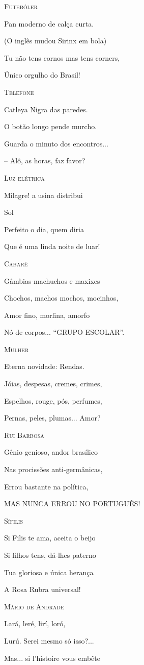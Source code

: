 \textsc{Futebóler}

Pan moderno de calça curta.

(O inglês mudou Sirinx em bola)

Tu não tens cornos mas tens corners,

Único orgulho do Brasil!

\textsc{Telefone}

Catleya Nigra das paredes.

O botão longo pende murcho.

Guarda o minuto dos encontros...

-- Alô, as horas, faz favor?

\textsc{Luz elétrica}

Milagre! a usina distribui

Sol

Perfeito o dia, quem diria

Que é uma linda noite de luar!

\textsc{Cabaré}

Gâmbias-machuchos e maxixes

Chochos, machos mochos, mocinhos,

Amor fino, morfina, amorfo

Nó de corpos... ``GRUPO ESCOLAR''.

\textsc{Mulher}

Eterna novidade: Rendas.

Jóias, despesas, cremes, crimes,

Espelhos, rouge, pós, perfumes,

Pernas, peles, plumas... Amor?

\textsc{Rui Barbosa}

Gênio genioso, andor brasílico

Nas procissões anti-germânicas,

Errou bastante na política,

MAS NUNCA ERROU NO PORTUGUÊS!

\textsc{Sífilis}

Si Filis te ama, aceita o beijo

Si filhos tens, dá-lhes paterno

Tua gloriosa e única herança

A Rosa Rubra universal!

\textsc{Mário de Andrade}

Lará, leré, lirí, loró,

Lurú. Serei mesmo só isso?...

Mas... si l'histoire vous embête


